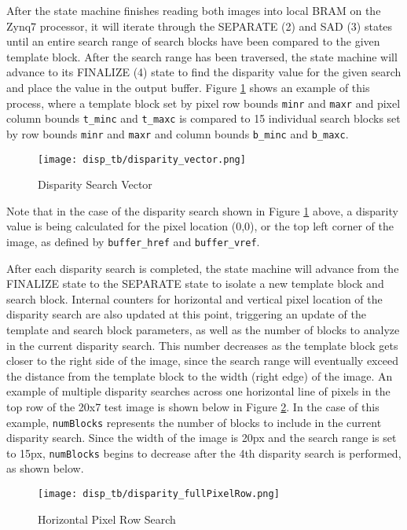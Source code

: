 After the state machine finishes reading both images into local BRAM on the Zynq7 processor, it will iterate through the SEPARATE (2) and SAD (3) states until an entire search range of search blocks have been compared to the given template block. After the search range has been traversed, the state machine will advance to its FINALIZE (4) state to find the disparity value for the given search and place the value in the output buffer. Figure \ref{disparityVector} shows an example of this process, where a template block set by pixel row bounds \texttt{minr} and \texttt{maxr} and pixel column bounds \texttt{t\_minc} and \texttt{t\_maxc} is compared to 15 individual search blocks set by row bounds \texttt{minr} and \texttt{maxr} and column bounds \texttt{b\_minc} and \texttt{b\_maxc}.
\par
\begin{figure}[H]
	\centerline{\texttt{[image: disp\_tb/disparity\_vector.png]}}
	\caption{Disparity Search Vector}
	\label{disparityVector}
\end{figure}
\par
Note that in the case of the disparity search shown in Figure \ref{disparityVector} above, a disparity value is being calculated for the pixel location (0,0), or the top left corner of the image, as defined by \texttt{buffer\_href} and \texttt{buffer\_vref}.
\par
After each disparity search is completed, the state machine will advance from the FINALIZE state to the SEPARATE state to isolate a new template block and search block. Internal counters for horizontal and vertical pixel location of the disparity search are also updated at this point, triggering an update of the template and search block parameters, as well as the number of blocks to analyze in the current disparity search. This number decreases as the template block gets closer to the right side of the image, since the search range will eventually exceed the distance from the template block to the width (right edge) of the image. An example of multiple disparity searches across one horizontal line of pixels in the top row of the 20x7 test image is shown below in Figure \ref{disparityHorizSearch}. In the case of this example, \texttt{numBlocks} represents the number of blocks to include in the current disparity search. Since the width of the image is 20px and the search range is set to 15px, \texttt{numBlocks} begins to decrease after the 4th disparity search is performed, as shown below.
\par
\begin{figure}[H]
	\centerline{\texttt{[image: disp\_tb/disparity\_fullPixelRow.png]}}
	\caption{Horizontal Pixel Row Search}
	\label{disparityHorizSearch}
\end{figure}
